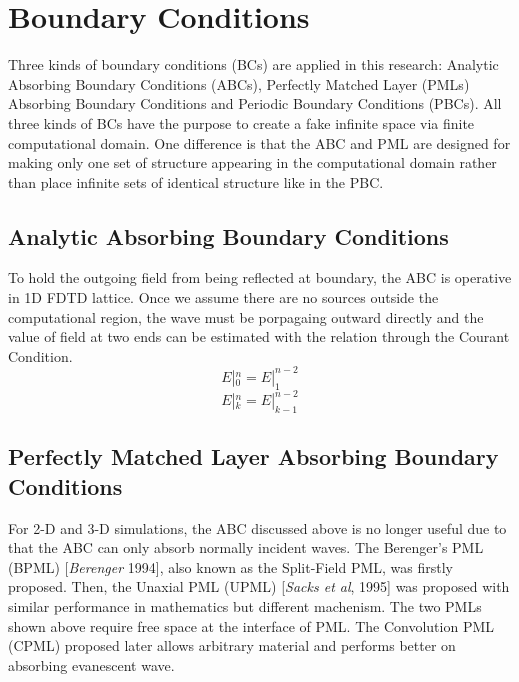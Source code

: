\section{Boundary Conditions}
\label{sec:bcs}
Three kinds of boundary conditions (BCs) are applied in this research: Analytic Absorbing Boundary Conditions (ABCs),
Perfectly Matched Layer (PMLs) Absorbing Boundary Conditions and Periodic Boundary Conditions (PBCs). All three kinds of
BCs have the purpose to create a fake infinite space via finite computational domain. One difference is that the ABC and
PML are designed for making only one set of structure appearing in the computational domain rather than place infinite
sets of identical structure like in the PBC.


\subsection{Analytic Absorbing Boundary Conditions}
To hold the outgoing field from being reflected at boundary, the ABC is operative in 1D FDTD lattice. Once we assume
there are no sources outside the computational region, the wave must be porpagaing outward directly and the value of field
at two ends can be estimated with the relation through the Courant Condition.
\begin{equation}
  E|_0^n = E|_1^{n-2}
\end{equation}
\begin{equation}
  E|_k^n = E|_{k-1}^{n-2}
\end{equation}



\subsection{Perfectly Matched Layer Absorbing Boundary Conditions}
\label{subsec:pml}
For 2-D and 3-D simulations, the ABC discussed above is no longer useful due to that the ABC can only absorb normally
incident waves. The Berenger's PML (BPML) [\textit{Berenger} 1994], also known as the Split-Field PML, was firstly
proposed. Then, the Unaxial PML (UPML) [\textit{Sacks et al}, 1995] was proposed with similar performance in mathematics
but different machenism. The two PMLs shown above require free space at the interface of PML. The Convolution PML (CPML)
proposed later allows arbitrary material and performs better on absorbing evanescent wave.

